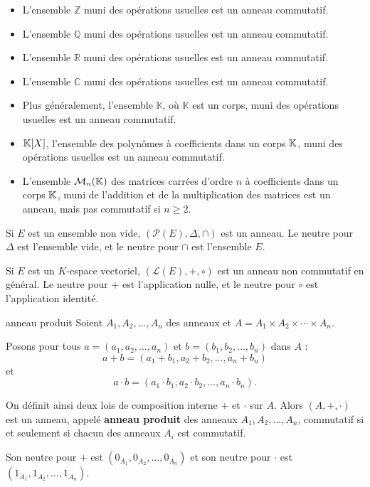 \begin{exemple}
    \begin{itemize}
        \item L'ensemble $\mathbb{Z}$ muni des opérations usuelles est un anneau commutatif.
        \item L'ensemble $\mathbb{Q}$ muni des opérations usuelles est un anneau commutatif.
        \item L'ensemble $\mathbb{R}$ muni des opérations usuelles est un anneau commutatif.
        \item L'ensemble $\mathbb{C}$ muni des opérations usuelles est un anneau commutatif.
        \item Plus généralement, l'ensemble $\mathbb{K}$, où $\mathbb{K}$ est un corps, muni des opérations usuelles est un anneau commutatif.
        \item $\mathbb{K}[X]$, l'ensemble des polynômes à coefficients dans un corps $\mathbb{K}$, muni des opérations usuelles est un anneau commutatif.
        \item L'ensemble $\mathcal{M}_n(\mathbb{K})$ des matrices carrées d'ordre $n$ à coefficients dans un corps $\mathbb{K}$, muni de l'addition et de la multiplication des matrices est un anneau, mais pas commutatif si $n \geq 2$.
    \end{itemize}

    Si $E$ est un ensemble non vide, $(\mathscr{P}(E), \Delta, \cap)$ est un anneau. Le neutre pour $\Delta$ est l'ensemble vide, 
    et le neutre pour $\cap$ est l'ensemble $E$.

    Si $E$ est un $K$-espace vectoriel, $(\mathscr{L}(E), +, \circ)$ est un anneau non commutatif en général. Le neutre pour $+$ est l'application nulle, et le neutre pour $\circ$ est l'application identité.
\end{exemple}


\begin{proposition}{anneau produit}{}
    Soient $A_1, A_2, \ldots, A_n$ des anneaux et $A = A_1 \times A_2 \times \cdots \times A_n$.

    Posons pour tous $a = (a_1, a_2, \ldots, a_n)$ et $b = (b_1, b_2, \ldots, b_n)$ dans $A$ :
    \[
        a + b = (a_1 + b_1, a_2 + b_2, \ldots, a_n + b_n)
    \]
    et
    \[
        a \cdot b = (a_1 \cdot b_1, a_2 \cdot b_2, \ldots, a_n \cdot b_n).
    \]

    On définit ainsi deux lois de composition interne $+$ et $\cdot$ sur $A$.
    Alors $(A, +, \cdot)$ est un anneau, appelé \textbf{anneau produit} des anneaux $A_1, A_2, \ldots, A_n$, 
    commutatif si et seulement si chacun des anneaux $A_i$ est commutatif.

    Son neutre pour $+$ est $(0_{A_1}, 0_{A_2}, \ldots, 0_{A_n})$ et son neutre pour $\cdot$ est $(1_{A_1}, 1_{A_2}, \ldots, 1_{A_n})$.
\end{proposition}

